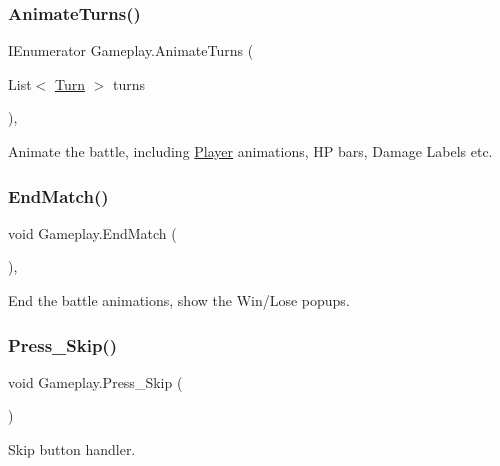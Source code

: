 \subsubsection{\texorpdfstring{AnimateTurns()}{AnimateTurns()}}
{\footnotesize\ttfamily I\+Enumerator Gameplay.\+Animate\+Turns (\begin{DoxyParamCaption}\item[{List$<$ \mbox{\hyperlink{class_turn}{Turn}} $>$}]{turns }\end{DoxyParamCaption})\hspace{0.3cm}{\ttfamily [inline]}, {\ttfamily [private]}}



Animate the battle, including \mbox{\hyperlink{class_player}{Player}} animations, HP bars, Damage Labels etc. 

\mbox{\label{class_gameplay_ab30c33d44acef3478ae5b601c14a4346}} 
\subsubsection{\texorpdfstring{EndMatch()}{EndMatch()}}
{\footnotesize\ttfamily void Gameplay.\+End\+Match (\begin{DoxyParamCaption}{ }\end{DoxyParamCaption})\hspace{0.3cm}{\ttfamily [inline]}, {\ttfamily [private]}}



End the battle animations, show the Win/\+Lose popups. 

\mbox{\label{class_gameplay_af68b4ea2b131c1c77a5daf9c5a0b5b5e}} 
\subsubsection{\texorpdfstring{Press\_Skip()}{Press\_Skip()}}
{\footnotesize\ttfamily void Gameplay.\+Press\+\_\+\+Skip (\begin{DoxyParamCaption}{ }\end{DoxyParamCaption})\hspace{0.3cm}{\ttfamily [inline]}}



Skip button handler. 


